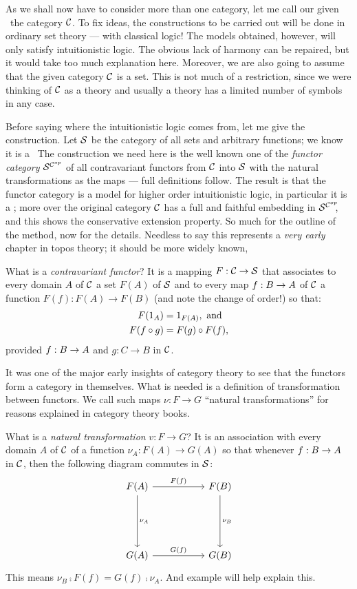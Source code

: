 As we shall now have to consider more than one category, let me call our given \ccc\ the category $\C$. To fix ideas, the constructions to be carried out will be done in ordinary set theory --- with classical logic! The models obtained, however, will only satisfy intuitionistic logic. The obvious lack of harmony can be repaired, but it would take too much explanation here. Moreover, we are also going to assume that the given category $\C$ is a set. This is not much of a restriction, since we were thinking of $\C$ as a theory and usually a theory has a limited number of symbols in any case.

Before saying where the intuitionistic logic comes from, let me give the construction. Let $\S$ be the category of all sets and arbitrary functions; we know it is a \ccc\  The construction we need here is the well known one of the {\it functor category} $\scop$ of all contravariant functors from $\C$ into $\S$ with the natural transformations as the maps --- full definitions follow. The result is that the functor category is a model for higher order intuitionistic logic, in particular it is a \ccc; more over the original category $\C$ has a full and faithful embedding in $\scop\!\!$, and this shows the conservative extension property. So much for the outline of the method, now for the details. Needless to say this represents a {\it very early} chapter in topos theory; it should be more widely known,

What is a {\it contravariant functor}? It is a mapping $F: \C\to \S$ that associates to every domain $A$ of $\C$ a set $F(A)$ of $\S$ and to every map $f: \BA$ of $\C$ a function $F(f) : F(A) \to F(B)$ (and note the change of order!) so that:
\begin{align*}
F(\id_A) &= \id_{F(A)} , {\textrm{ and}}\\
F(f \comp g) &= F(g) \comp F(f),
\end{align*}
%
provided $f: \BA$ and $g: C \to B$ in $\C$.

It was one of the major early insights of category theory to see that the functors form
a category in themselves. What is needed is a definition of transformation between functors. We call such maps $\nu : F \to G$ ``natural transformations'' for reasons explained in category theory books.

What is a {\it natural transformation} $v : F\to G$? It is an association with every domain $A$ of $\C$ of a function $\nu_A: F(A)\to G(A)$ so that whenever $f : \BA$ in $\C$, then the following diagram commutes in $\S$:
\[
\begin{tikzcd}[row sep=.75in, column sep = .75in]
    F(A) \arrow{d}{\nu_A} \arrow{r}{F(f)}  & F(B) \arrow{d}{\nu_B} \\
    G(A)  \arrow{r}{G(f)} & G(B)
\end{tikzcd}
\]
This means $\nu_B \comp F(f) = G(f) \comp \nu_A$. And example will help explain this.

